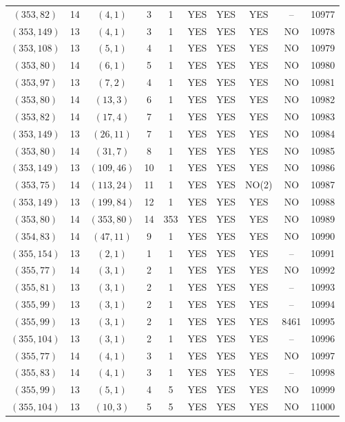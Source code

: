 \begin{longtable}{|c|c|c|c|c|c|c|c|c|c|}
$(353, 82)$ & 14 & $(4, 1)$ & 3 & 1 & YES & YES & YES & -- & 10977\\
$(353, 149)$ & 13 & $(4, 1)$ & 3 & 1 & YES & YES & YES & NO & 10978\\
$(353, 108)$ & 13 & $(5, 1)$ & 4 & 1 & YES & YES & YES & NO & 10979\\
$(353, 80)$ & 14 & $(6, 1)$ & 5 & 1 & YES & YES & YES & NO & 10980\\
$(353, 97)$ & 13 & $(7, 2)$ & 4 & 1 & YES & YES & YES & NO & 10981\\
$(353, 80)$ & 14 & $(13, 3)$ & 6 & 1 & YES & YES & YES & NO & 10982\\
$(353, 82)$ & 14 & $(17, 4)$ & 7 & 1 & YES & YES & YES & NO & 10983\\
$(353, 149)$ & 13 & $(26, 11)$ & 7 & 1 & YES & YES & YES & NO & 10984\\
$(353, 80)$ & 14 & $(31, 7)$ & 8 & 1 & YES & YES & YES & NO & 10985\\
$(353, 149)$ & 13 & $(109, 46)$ & 10 & 1 & YES & YES & YES & NO & 10986\\
$(353, 75)$ & 14 & $(113, 24)$ & 11 & 1 & YES & YES & NO(2) & NO & 10987\\
$(353, 149)$ & 13 & $(199, 84)$ & 12 & 1 & YES & YES & YES & NO & 10988\\
$(353, 80)$ & 14 & $(353, 80)$ & 14 & 353 & YES & YES & YES & NO & 10989\\
$(354, 83)$ & 14 & $(47, 11)$ & 9 & 1 & YES & YES & YES & NO & 10990\\
$(355, 154)$ & 13 & $(2, 1)$ & 1 & 1 & YES & YES & YES & -- & 10991\\
$(355, 77)$ & 14 & $(3, 1)$ & 2 & 1 & YES & YES & YES & NO & 10992\\
$(355, 81)$ & 13 & $(3, 1)$ & 2 & 1 & YES & YES & YES & -- & 10993\\
$(355, 99)$ & 13 & $(3, 1)$ & 2 & 1 & YES & YES & YES & -- & 10994\\
$(355, 99)$ & 13 & $(3, 1)$ & 2 & 1 & YES & YES & YES & 8461 & 10995\\
$(355, 104)$ & 13 & $(3, 1)$ & 2 & 1 & YES & YES & YES & -- & 10996\\
$(355, 77)$ & 14 & $(4, 1)$ & 3 & 1 & YES & YES & YES & NO & 10997\\
$(355, 83)$ & 14 & $(4, 1)$ & 3 & 1 & YES & YES & YES & -- & 10998\\
$(355, 99)$ & 13 & $(5, 1)$ & 4 & 5 & YES & YES & YES & NO & 10999\\
$(355, 104)$ & 13 & $(10, 3)$ & 5 & 5 & YES & YES & YES & NO & 11000\\

\end{longtable}
